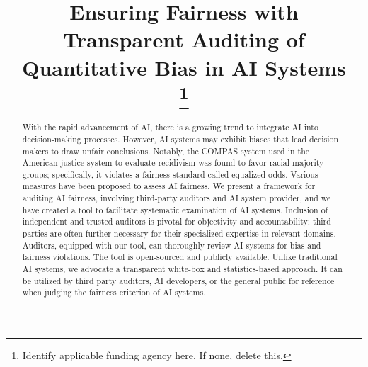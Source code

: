 \documentclass[conference]{IEEEtran}
\begin{document}
\title{Ensuring Fairness with Transparent Auditing of Quantitative Bias in AI Systems\\
\thanks{Identify applicable funding agency here. If none, delete this.}
}

\author{
\and
{}
}


\maketitle

\begin{abstract}
With the rapid advancement of AI, there is a growing trend to integrate AI into decision-making processes. However, AI systems may exhibit biases that lead decision makers to draw unfair conclusions. Notably, the COMPAS system used in the American justice system to evaluate recidivism was found to favor racial majority groups; specifically, it violates a fairness standard called equalized odds. Various measures have been proposed to assess AI fairness. We present a framework for auditing AI fairness, involving third-party auditors and AI system provider, and we have created a tool to facilitate systematic examination of AI systems. Inclusion of independent and trusted auditors is pivotal for objectivity and accountability; third parties are often further necessary for their specialized expertise in relevant domains. Auditors, equipped with our tool, can thoroughly review AI systems for bias and fairness violations. The tool is open-sourced and publicly available. Unlike traditional AI systems, we advocate a transparent white-box and statistics-based approach. It can be utilized by third party auditors, AI developers, or the general public for reference when judging the fairness criterion of AI systems.
\end{abstract}
\end{document}
